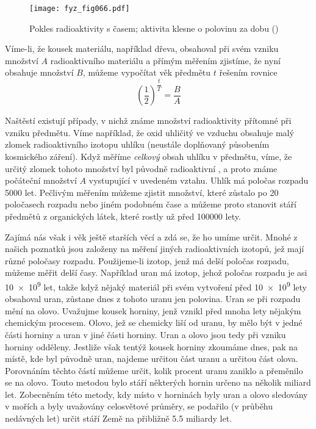 {    \begin{figure}[ht!]  %
      \centering
      \texttt{[image: fyz\_fig066.pdf]}
      \caption{Pokles radioaktivity s časem; aktivita klesne o polovinu za dobu  (\cite[s.~68]{Feynman01})}
      \label{fyz:fig066}
    \end{figure}    
    Víme-li, že kousek materiálu, například dřeva, obsahoval při svém vzniku množství \(A\) 
    radioaktivního materiálu a přímým měřením zjistíme, že nyní obsahuje množství \(B\), můžeme 
    vypočítat věk předmětu \(t\) řešením rovnice
    \begin{equation}\label{FYZ:eq065}
      \left(\dfrac{1}{2}\right)^{\dfrac{t}{T}} = \dfrac{B}{A}
    \end{equation}
    
    Naštěstí existují případy, v nichž známe množství radioaktivity přítomné při vzniku předmětu. 
    Víme například, že oxid uhličitý ve vzduchu obsahuje malý zlomek radioaktivního izotopu uhlíku 
     (neustále doplňovaný působením kosmického záření). Když měříme \emph{celkový} obsah 
    uhlíku v předmětu, víme, že určitý zlomek tohoto množství byl původně radioaktivní , 
    a proto známe počáteční množství \(A\) vystupující v uvedeném vztahu. Uhlík  má 
    poločas rozpadu \num{5000} let. Pečlivým měřením můžeme zjistit množství, které zůstalo po 
    \num{20} poločasech rozpadu nebo jiném podobném čase a můžeme proto stanovit stáří předmětů z 
    organických látek, které rostly už před \num{100000} lety.
    
    Zajímá nás však i věk ještě starších věcí a zdá se, že ho umíme určit. Mnohé z našich poznatků 
    jsou založeny na měření jiných radioaktivních izotopů, jež mají různé poločasy rozpadu. 
    Použijeme-li izotop, jenž má delší poločas rozpadu, můžeme měřit delší časy. Například uran má 
    izotop, jehož poločas rozpadu je asi \num{10e9} let, takže když nějaký materiál při svém 
    vytvoření před \num{10e9} lety obsahoval uran, zůstane dnes z tohoto uranu jen polovina. Uran 
    se při rozpadu mění na olovo. Uvažujme kousek horniny, jenž vznikl před mnoha lety nějakým 
    chemickým procesem. Olovo, jež se chemicky liší od uranu, by mělo být v jedné části horniny a 
    uran v jiné části horniny. Uran a olovo jsou tedy při vzniku horniny odděleny. Jestliže však 
    tentýž kousek horniny zkoumáme dnes, pak na místě, kde byl původně uran, najdeme určitou část 
    uranu a určitou část olova. Porovnáním těchto částí můžeme určit, kolik procent uranu zaniklo a 
    přeměnilo se na olovo. Touto metodou bylo stáří některých hornin určeno na několik miliard let. 
    Zobecněním této metody, kdy místo v horninách byly uran a olovo sledovány v mořích a byly 
    uvažovány celosvětové průměry, se podařilo (v průběhu nedávných let) určit stáří Země na 
    přibližně \num{5.5} miliardy let.
    
}
